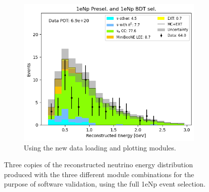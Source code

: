\begin{figure}[H]
    \begin{subfigure}[t]{0.31\linewidth}
        \includegraphics[width=\linewidth]{technote/EventSelections/Figures/Run123_1eNp_RecoEnergy_Alex.png}
        \caption{Using the new data loading and plotting modules.}
    \end{subfigure}%
    \caption{Three copies of the reconstructed neutrino energy distribution produced with the three different module combinations for the purpose of software validation, using the full 1eNp event selection.}
    \label{fig:distvalidation_1eNp}
\end{figure}

